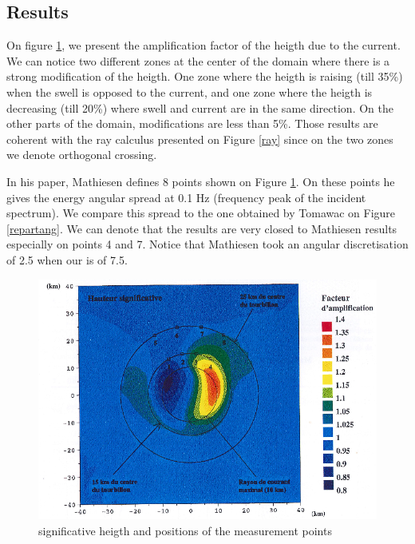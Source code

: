 \subsection{Results}
%
On figure \ref{measurepts}, we present the amplification factor of the heigth
due to the current. We can notice two different zones at the center of the
domain where there is a strong modification of the heigth. One zone where the
heigth is raising (till 35\%) when the swell is opposed to the current, and one
zone where the heigth is decreasing (till 20\%) where swell and current are in
the same direction. On the other parts of the domain, modifications are less than
5\%. Those results are coherent with the ray calculus presented on Figure
\ref{ray} since on the two zones we denote orthogonal crossing.

In his paper, Mathiesen \cite{Mathiesen1987} defines 8 points shown on
Figure \ref{measurepts}. On these points he gives the energy angular spread at
0.1 Hz (frequency peak of the incident spectrum). We compare this spread to the
one obtained by Tomawac on Figure \ref{repartang}. We can denote that the
results are very closed to Mathiesen results especially on points 4 and 7.
Notice that Mathiesen took an angular discretisation of 2.5 when our is of 7.5.

\begin{figure} [!h]
\centering
\includegraphics[scale=0.6]{whirlcurrentpoints.png}
 \caption{significative heigth and positions of the measurement points}
\label{measurepts}
\end{figure}


